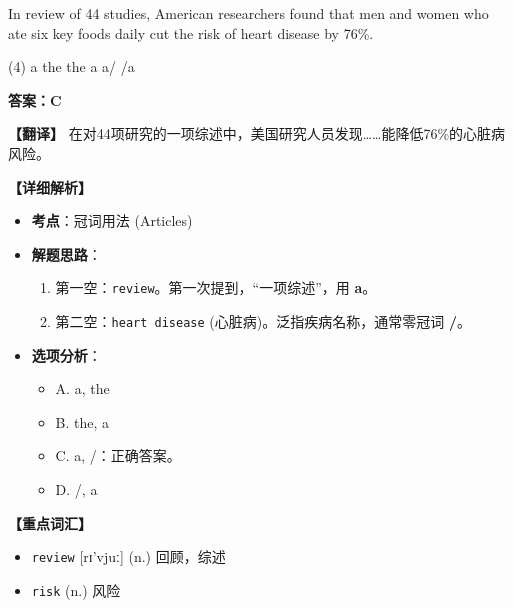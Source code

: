 \documentclass[11pt, a4paper]{article}
\newcommand{\analysis}[4]{
    \begin{solutionbox}
        \textbf{答案：#1}
        
        \textbf{【翻译】} #2
        
        \textbf{【详细解析】}
        #3
        
        \textbf{【重点词汇】}
        #4
    \end{solutionbox}
}
\newcommand{\blank}{\underline{\hspace{1.5cm}}}
\begin{document}
\begin{questions}
    \item In \blank review of 44 studies, American researchers found that men and women who ate six key foods daily cut the risk of \blank heart disease by 76\%.
    \begin{tasks}(4)
        \task a the \task the a \task a/ \task /a
    \end{tasks}
    \analysis{C}{在对44项研究的一项综述中，美国研究人员发现……能降低76\%的心脏病风险。}{
        \begin{itemize}
            \item \textbf{考点}：冠词用法 (Articles)
            \item \textbf{解题思路}：
                \begin{enumerate}
                    \item 第一空：\texttt{review}。第一次提到，“一项综述”，用 \textbf{a}。
                    \item 第二空：\texttt{heart disease} (心脏病)。泛指疾病名称，通常零冠词 \textbf{/}。
                \end{enumerate}
            \item \textbf{选项分析}：
                \begin{itemize}
                    \item A. a, the
                    \item B. the, a
                    \item C. a, /：正确答案。
                    \item D. /, a
                \end{itemize}
        \end{itemize}
    }{
        \begin{itemize}
            \item \texttt{review} [rɪ'vjuː] (n.) 回顾，综述
            \item \texttt{risk} (n.) 风险
        \end{itemize}
    }


\end{questions}
\end{document}
